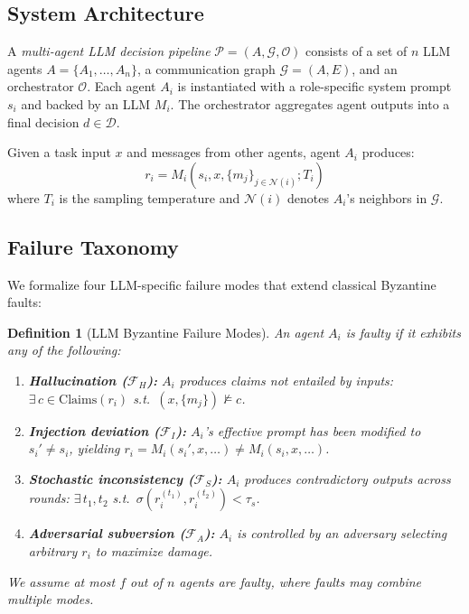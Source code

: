 \documentclass[journal,10pt]{IEEEtran}
\newtheorem{definition}{Definition}
\newcommand{\calD}{\mathcal{D}}
\newcommand{\calF}{\mathcal{F}}
\newcommand{\calG}{\mathcal{G}}
\newcommand{\calO}{\mathcal{O}}
\newcommand{\calP}{\mathcal{P}}
\begin{document}
\subsection{System Architecture}
A \emph{multi-agent LLM decision pipeline} $\calP = (A, \calG, \calO)$ consists of a set of $n$ LLM agents $A = \{A_1, \ldots, A_n\}$, a communication graph $\calG = (A, E)$, and an orchestrator $\calO$. Each agent $A_i$ is instantiated with a role-specific system prompt $s_i$ and backed by an LLM $M_i$. The orchestrator aggregates agent outputs into a final decision $d \in \calD$.

Given a task input $x$ and messages from other agents, agent $A_i$ produces:
\begin{equation}\label{eq:agent}
r_i = M_i(s_i, x, \{m_j\}_{j \in \mathcal{N}(i)}; T_i)
\end{equation}
where $T_i$ is the sampling temperature and $\mathcal{N}(i)$ denotes $A_i$'s neighbors in $\calG$.

\subsection{Failure Taxonomy}
We formalize four LLM-specific failure modes that extend classical Byzantine faults:

\begin{definition}[LLM Byzantine Failure Modes]\label{def:failures}
An agent $A_i$ is \emph{faulty} if it exhibits any of the following:
\begin{enumerate}
\item \textbf{Hallucination ($\calF_H$):} $A_i$ produces claims not entailed by inputs: $\exists\, c \in \text{Claims}(r_i)$ s.t.\ $(x, \{m_j\}) \not\models c$.
\item \textbf{Injection deviation ($\calF_I$):} $A_i$'s effective prompt has been modified to $s_i' \neq s_i$, yielding $r_i = M_i(s_i', x, \ldots) \neq M_i(s_i, x, \ldots)$.
\item \textbf{Stochastic inconsistency ($\calF_S$):} $A_i$ produces contradictory outputs across rounds: $\exists\, t_1, t_2$ s.t.\ $\sigma(r_i^{(t_1)}, r_i^{(t_2)}) < \tau_s$.
\item \textbf{Adversarial subversion ($\calF_A$):} $A_i$ is controlled by an adversary selecting arbitrary $r_i$ to maximize damage.
\end{enumerate}
We assume at most $f$ out of $n$ agents are faulty, where faults may combine multiple modes.
\end{definition}
\end{document}

